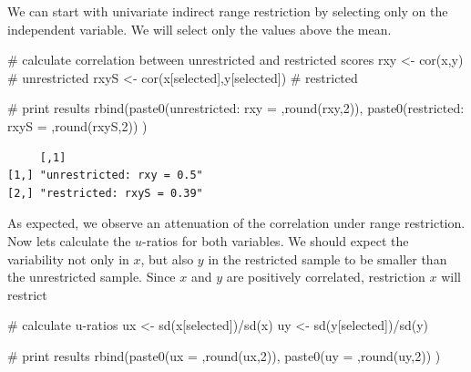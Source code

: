 \documentclass[
  letterpaper,
  DIV=11,
  numbers=noendperiod]{scrreprt}
\newenvironment{Shaded}{\begin{snugshade}}{\end{snugshade}}
\newcommand{\CommentTok}[1]{\textcolor[rgb]{0.37,0.37,0.37}{#1}}
\newcommand{\DecValTok}[1]{\textcolor[rgb]{0.68,0.00,0.00}{#1}}
\newcommand{\FunctionTok}[1]{\textcolor[rgb]{0.28,0.35,0.67}{#1}}
\newcommand{\NormalTok}[1]{\textcolor[rgb]{0.00,0.23,0.31}{#1}}
\newcommand{\OtherTok}[1]{\textcolor[rgb]{0.00,0.23,0.31}{#1}}
\newcommand{\SpecialCharTok}[1]{\textcolor[rgb]{0.37,0.37,0.37}{#1}}
\newcommand{\StringTok}[1]{\textcolor[rgb]{0.13,0.47,0.30}{#1}}
\begin{document}
We can start with univariate indirect range restriction by selecting
only on the independent variable. We will select only the values above
the mean.

\begin{Shaded}
\begin{Highlighting}[]
\CommentTok{\# calculate correlation between unrestricted and restricted scores}
\NormalTok{rxy }\OtherTok{\textless{}{-}} \FunctionTok{cor}\NormalTok{(x,y) }\CommentTok{\# unrestricted}
\NormalTok{rxyS }\OtherTok{\textless{}{-}} \FunctionTok{cor}\NormalTok{(x[selected],y[selected]) }\CommentTok{\# restricted}

\CommentTok{\# print results}
\FunctionTok{rbind}\NormalTok{(}\FunctionTok{paste0}\NormalTok{(}\StringTok{\textquotesingle{}unrestricted: rxy = \textquotesingle{}}\NormalTok{,}\FunctionTok{round}\NormalTok{(rxy,}\DecValTok{2}\NormalTok{)),}
      \FunctionTok{paste0}\NormalTok{(}\StringTok{\textquotesingle{}restricted: rxyS = \textquotesingle{}}\NormalTok{,}\FunctionTok{round}\NormalTok{(rxyS,}\DecValTok{2}\NormalTok{))}
\NormalTok{      )}
\end{Highlighting}
\end{Shaded}

\begin{verbatim}
     [,1]                     
[1,] "unrestricted: rxy = 0.5"
[2,] "restricted: rxyS = 0.39"
\end{verbatim}

As expected, we observe an attenuation of the correlation under range
restriction. Now lets calculate the \(u\)-ratios for both variables. We
should expect the variability not only in \(x\), but also \(y\) in the
restricted sample to be smaller than the unrestricted sample. Since
\(x\) and \(y\) are positively correlated, restriction \(x\) will
restrict

\begin{Shaded}
\begin{Highlighting}[]
\CommentTok{\# calculate u{-}ratios}
\NormalTok{ux }\OtherTok{\textless{}{-}} \FunctionTok{sd}\NormalTok{(x[selected])}\SpecialCharTok{/}\FunctionTok{sd}\NormalTok{(x)}
\NormalTok{uy }\OtherTok{\textless{}{-}} \FunctionTok{sd}\NormalTok{(y[selected])}\SpecialCharTok{/}\FunctionTok{sd}\NormalTok{(y)}

\CommentTok{\# print results}
\FunctionTok{rbind}\NormalTok{(}\FunctionTok{paste0}\NormalTok{(}\StringTok{\textquotesingle{}ux = \textquotesingle{}}\NormalTok{,}\FunctionTok{round}\NormalTok{(ux,}\DecValTok{2}\NormalTok{)),}
      \FunctionTok{paste0}\NormalTok{(}\StringTok{\textquotesingle{}uy = \textquotesingle{}}\NormalTok{,}\FunctionTok{round}\NormalTok{(uy,}\DecValTok{2}\NormalTok{))}
\NormalTok{      )}
\end{Highlighting}
\end{Shaded}
\end{document}
